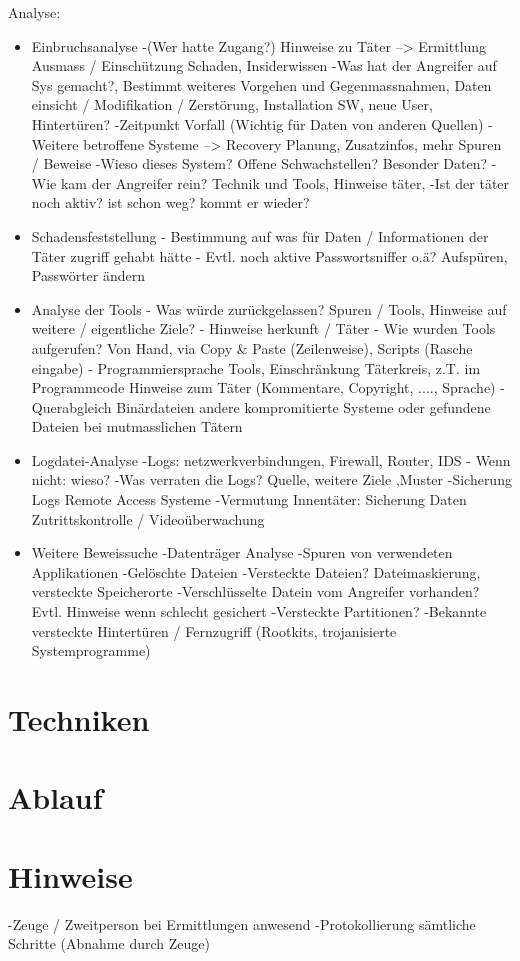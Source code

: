 Analyse:
\begin{itemize}
\item Einbruchsanalyse 
	-(Wer hatte Zugang?) Hinweise zu Täter --> Ermittlung Ausmass / Einschützung Schaden, Insiderwissen
	-Was hat der Angreifer auf Sys gemacht?, Bestimmt weiteres Vorgehen und Gegenmassnahmen, Daten einsicht / Modifikation / Zerstörung, Installation SW, neue User, Hintertüren?
	-Zeitpunkt Vorfall (Wichtig für Daten von anderen Quellen)
	-Weitere betroffene Systeme --> Recovery Planung, Zusatzinfos, mehr Spuren / Beweise
	-Wieso dieses System? Offene Schwachstellen? Besonder Daten?
	-Wie kam der Angreifer rein? Technik und Tools, Hinweise täter, 
	-Ist der täter noch aktiv? ist schon weg? kommt er wieder?
\item Schadensfeststellung
	- Bestimmung auf was für Daten / Informationen der Täter zugriff gehabt hätte
	- Evtl. noch aktive Passwortsniffer o.ä? Aufspüren, Passwörter ändern
\item Analyse der Tools
	- Was würde zurückgelassen? Spuren / Tools, Hinweise auf weitere / eigentliche Ziele?
	- Hinweise herkunft / Täter
	- Wie wurden Tools aufgerufen? Von Hand, via Copy & Paste (Zeilenweise), Scripts (Rasche eingabe)
	- Programmiersprache Tools, Einschränkung Täterkreis, z.T. im Programmcode Hinweise zum Täter (Kommentare, Copyright, ...., Sprache)
	- Querabgleich Binärdateien andere kompromitierte Systeme oder gefundene Dateien bei mutmasslichen Tätern
\item Logdatei-Analyse
	-Logs: netzwerkverbindungen, Firewall, Router, IDS - Wenn nicht: wieso?
	-Was verraten die Logs? Quelle, weitere Ziele ,Muster
	-Sicherung Logs Remote Access Systeme
	-Vermutung Innentäter: Sicherung Daten Zutrittskontrolle / Videoüberwachung
\item Weitere Beweissuche
	-Datenträger Analyse
	-Spuren von verwendeten Applikationen
	-Gelöschte Dateien
	-Versteckte Dateien? Dateimaskierung, versteckte Speicherorte
	-Verschlüsselte Datein vom Angreifer vorhanden? Evtl. Hinweise wenn schlecht gesichert
	-Versteckte Partitionen?
	-Bekannte versteckte Hintertüren / Fernzugriff (Rootkits, trojanisierte Systemprogramme)
\end{itemize}

\section{Techniken}
\section{Ablauf}


\section{Hinweise}
-Zeuge / Zweitperson bei Ermittlungen anwesend
-Protokollierung sämtliche Schritte (Abnahme durch Zeuge)